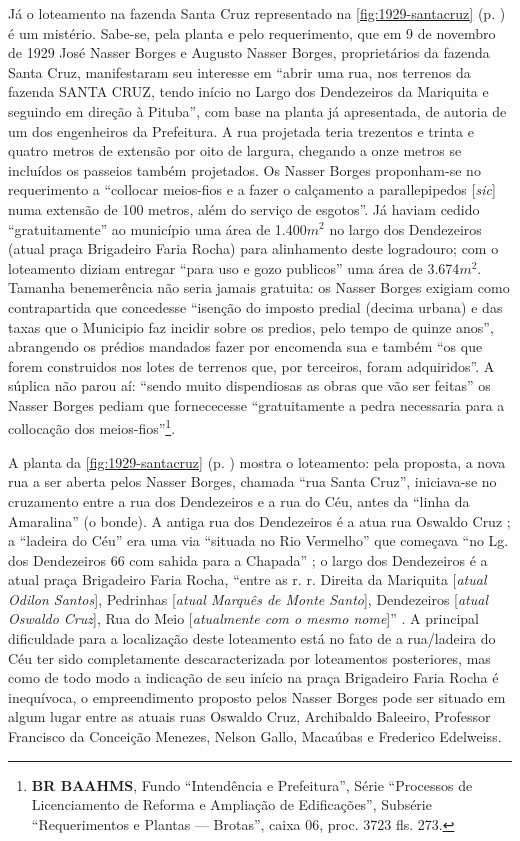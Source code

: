 Já o loteamento na fazenda Santa Cruz representado na \autoref{fig:1929-santacruz} (p. \pageref{fig:1929-santacruz}) é um mistério. Sabe-se, pela planta e pelo requerimento, que em 9 de novembro de 1929 José Nasser Borges e Augusto Nasser Borges, proprietários da fazenda Santa Cruz, manifestaram seu interesse em ``abrir uma rua, nos terrenos da fazenda SANTA CRUZ, tendo início no Largo dos Dendezeiros da Mariquita e seguindo em direção à Pituba'', com base na planta já apresentada, de autoria de um dos engenheiros da Prefeitura. A rua projetada teria trezentos e trinta e quatro metros de extensão por oito de largura, chegando a onze metros se incluídos os passeios também projetados. Os Nasser Borges proponham-se no requerimento a ``collocar meios-fios e a fazer o calçamento a parallepipedos [\textit{sic}] numa extensão de 100 metros, além do serviço de esgotos''. Já haviam cedido ``gratuitamente'' ao município uma área de 1.400$m^{2}$ no largo dos Dendezeiros (atual praça Brigadeiro Faria Rocha) para alinhamento deste logradouro; com o loteamento diziam entregar ``para uso e gozo publicos'' uma área de 3.674$m^{2}$. Tamanha benemerência não seria jamais gratuita: os Nasser Borges exigiam como contrapartida que concedesse ``isenção do imposto predial (decima urbana) e das taxas que o Municipio faz incidir sobre os predios, pelo tempo de quinze anos'', abrangendo os prédios mandados fazer por encomenda sua e também ``os que forem construidos nos lotes de terrenos que, por terceiros, foram adquiridos''. A súplica não parou aí: ``sendo muito dispendiosas as obras que vão ser feitas'' os Nasser Borges pediam que fornececesse ``gratuitamente a pedra necessaria para a collocação dos meios-fios''\footnote{\textbf{BR BAAHMS}, Fundo ``Intendência e Prefeitura'', Série ``Processos de Licenciamento de Reforma e Ampliação de Edificações'', Subsérie ``Requerimentos e Plantas --- Brotas'', caixa 06, proc. 3723 fls. 273.}.

A planta da \autoref{fig:1929-santacruz} (p. \pageref{fig:1929-santacruz}) mostra o loteamento: pela proposta, a nova rua a ser aberta pelos Nasser Borges, chamada ``rua Santa Cruz'', iniciava-se no cruzamento entre a rua dos Dendezeiros e a rua do Céu, antes da ``linha da Amaralina'' (o bonde). A antiga rua dos Dendezeiros é a atua rua Oswaldo Cruz \cite[p.~100]{souza_guia_1935}; a ``ladeira do Céu'' era uma via ``situada no Rio Vermelho'' que começava ``no Lg. dos Dendezeiros 66 com sahida para a Chapada'' \cite[p.~33]{souza_guia_1935}; o largo dos Dendezeiros é a atual praça Brigadeiro Faria Rocha, ``entre as r. r. Direita da Mariquita [\textit{atual Odilon Santos}], Pedrinhas [\textit{atual Marquês de Monte Santo}], Dendezeiros [\textit{atual Oswaldo Cruz}], Rua do Meio [\textit{atualmente com o mesmo nome}]'' \cite[p.~22]{souza_guia_1935}. A principal dificuldade para a localização deste loteamento está no fato de a rua/ladeira do Céu ter sido completamente descaracterizada por loteamentos posteriores, mas como de todo modo a indicação de seu início na praça Brigadeiro Faria Rocha é inequívoca, o empreendimento proposto pelos Nasser Borges pode ser situado em algum lugar entre as atuais ruas Oswaldo Cruz, Archibaldo Baleeiro, Professor Francisco da Conceição Menezes, Nelson Gallo, Macaúbas e Frederico Edelweiss.

